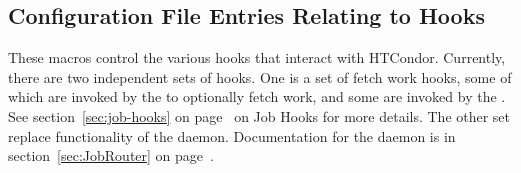 \subsection{\label{sec:Config-hooks}Configuration File Entries Relating to Hooks}

These macros control the various hooks that interact with HTCondor.
Currently, there are two independent sets of hooks.
One is a set of fetch work hooks, some of which are invoked by
the  to optionally fetch work,
and some are invoked by the .
See section~\ref{sec:job-hooks} on page~\pageref{sec:job-hooks} on
Job Hooks for more details.
The other set replace functionality of the  daemon.
Documentation for the  daemon is in
section~\ref{sec:JobRouter} on page~\pageref{sec:JobRouter}.


